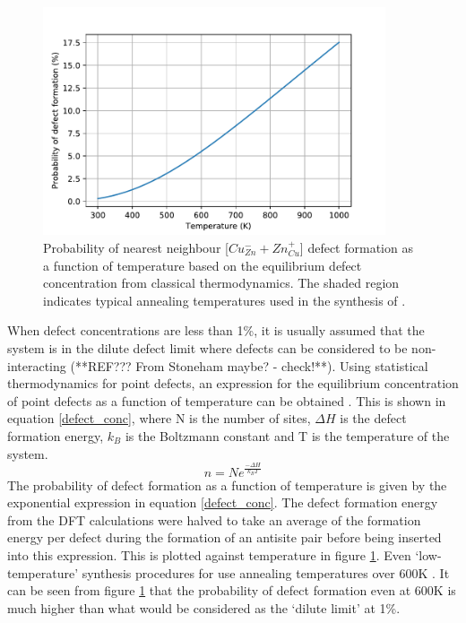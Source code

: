 \documentclass[11pt, twoside]{report}
\begin{document}
\begin{figure}[h!]
  \centering
    \includegraphics[width=0.9\textwidth]{figures/CZTS_Cu-Zn_defect_conc.pdf}
    \caption{Probability of nearest neighbour [$Cu_{Zn}^- + Zn_{Cu}^+$] defect formation as a function of temperature based on the equilibrium defect concentration from classical thermodynamics. The shaded region indicates typical annealing temperatures used in the synthesis of {\CZTS}.}
  \label{Cu-Zn_eqm_conc}
\end{figure}

When defect concentrations are less than 1\%, it is usually assumed that the system is in the dilute defect limit where defects can be considered to be non-interacting (**REF??? From Stoneham maybe? - check!**). Using statistical thermodynamics for point defects, an expression for the equilibrium concentration of point defects as a function of temperature can be obtained \cite{thermodynamics}. This is shown in equation \ref{defect_conc}, where N is the number of sites, $\Delta H$ is the defect formation energy, $k_B$ is the Boltzmann constant and T is the temperature of the system.
\begin{equation} \label{defect_conc}
n = Ne^{\frac{-\Delta H}{k_BT}}
\end{equation}
The probability of defect formation as a function of temperature is given by the exponential expression in equation \ref{defect_conc}. The defect formation energy from the DFT calculations were halved to take an average of the formation energy per defect during the formation of an antisite pair before being inserted into this expression. This is plotted against temperature in figure \ref{Cu-Zn_eqm_conc}. 
Even `low-temperature' synthesis procedures for {\CZTS} use annealing temperatures over 600K \cite{low_T_CZTS}. It can be seen from figure \ref{Cu-Zn_eqm_conc} that the probability of defect formation even at 600K is much higher than what would be considered as the `dilute limit' at 1\%.
\end{document}

